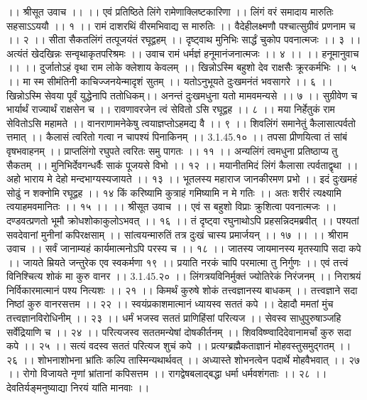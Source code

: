 ।। श्रीसूत उवाच ।। ।।
एवं प्रतिष्ठिते लिंगे रामेणाक्लिष्टकारिणा ।।
लिंगं वरं समादाय मारुतिः सहसाऽऽययौ ।। १ ।।
रामं दाशरथिं वीरमभिवाद्य स मारुतिः ।।
वैदेहीलक्ष्मणौ पश्चात्सुग्रीवं प्रणनाम च ।। २ ।।
सीता सैकतलिंगं तत्पूजयंतं रघूद्वहम् ।।
दृष्ट्वाथ मुनिभिः सार्द्धं चुकोप पवनात्मजः ।। ३ ।।
अत्यंतं खेदखिन्नः सन्वृथाकृतपरिश्रमः ।।
उवाच रामं धर्मज्ञं हनूमानंजनात्मजः ।। ४ ।।
।। हनूमानुवाच ।। ।।
दुर्जातोऽहं वृथा राम लोके क्लेशाय केवलम् ।।
खिन्नोऽस्मि बहुशो देव राक्षसैः क्रूरकर्मभिः ।। ५ ।।
मा स्म सीमंतिनी काचिज्जनयेन्मादृशं सुतम् ।।
यतोऽनुभूयते दुःखमनंतं भवसागरे ।। ६ ।।
खिन्नोऽस्मि सेवया पूर्वं युद्धेनापि ततोधिकम्।।
अनन्तं दुःखमधुना यतो मामवमन्यसे ।। ७ ।।
सुग्रीवेण च भार्यार्थं राज्यार्थं राक्षसेन च ।।
रावणावरजेन त्वं सेवितो ऽसि रघूद्वह ।। ८ ।।
मया निर्हेतुकं राम सेवितोऽसि महामते ।।
वानराणामनेकेषु त्वयाज्ञप्तोऽहमद्य वै ।। ९ ।।
शिवलिंगं समानेतुं कैलासात्पर्वतो त्तमात् ।।
कैलासं त्वरितो गत्वा न चापश्यं पिनाकिनम् ।। 3.1.45.१० ।।
तपसा प्रीणयित्वा तं सांबं वृषभवाहनम् ।।
प्राप्तलिंगो रघुपते त्वरितः समु पागतः ।। ११ ।।
अन्यलिंगं त्वमधुना प्रतिष्ठाप्य तु सैकतम् ।।
मुनिभिर्देवगन्धर्वैः साकं पूजयसे विभो ।। १२ ।।
मयानीतमिदं लिंगं कैलासा त्पर्वताद्वृथा ।।
अहो भाराय मे देहो मन्दभाग्यस्यजायते ।। १३ ।।
भूतलस्य महाराज जानकीरमण प्रभो ।।
इदं दुःखमहं सोढुं न शक्नोमि रघूद्वह ।। १४
किं करिष्यामि कुत्राहं गमिष्यामि न मे गतिः ।।
अतः शरीरं त्यक्ष्यामि त्वयाहमवमानितः ।। १५ ।।
।। श्रीसूत उवाच ।।
एवं स बहुशो विप्राः क्रुशित्वा पवनात्मजः ।।
दण्डवत्प्रणतो भूमौ क्रोधशोकाकुलोऽभवत् ।। १६ ।।
तं दृष्ट्वा रघुनाथोऽपि प्रहसन्निदमब्रवीत् ।।
पश्यतां सवदेवानां मुनीनां कपिरक्षसाम् ।।
सांत्वयन्मारुतिं तत्र दुःखं चास्य प्रमार्जयन् ।। १७ ।।
।। श्रीराम उवाच ।।
सर्वं जानाम्यहं कार्यमात्मनोऽपि परस्य च ।। १८ ।।
जातस्य जायमानस्य मृतस्यापि सदा कपे ।।
जायते म्रियते जन्तुरेक एव स्वकर्मणा १९ ।।
प्रयाति नरकं चापि परमात्मा तु निर्गुणः ।।
एवं तत्त्वं विनिश्चित्य शोकं मा कुरु वानर ।। 3.1.45.२० ।।
लिंगत्रयविनिर्मुक्तं ज्योतिरेकं निरंजनम् ।।
निराश्रयं निर्विकारमात्मानं पश्य नित्यशः ।। २१ ।।
किमर्थं कुरुषे शोकं तत्त्वज्ञानस्य बाधकम् ।।
तत्त्वज्ञाने सदा निष्ठां कुरु वानरसत्तम ।। २२ ।।
स्वयंप्रकाशमात्मानं ध्यायस्व सततं कपे ।।
देहादौ ममतां मुंच तत्त्वज्ञानविरोधिनीम् ।। २३ ।।
धर्मं भजस्व सततं प्राणिहिंसां परित्यज ।।
सेवस्व साधुपुरुषाञ्जहि सर्वेंद्रियाणि च ।। २४ ।।
परित्यजस्व सततमन्येषां दोषकीर्तनम् ।।
शिवविष्ण्वादिदेवानामर्चां कुरु सदा कपे ।। २५ ।।
सत्यं वदस्व सततं परित्यज शुचं कपे ।।
प्रत्यग्ब्रह्मैकताज्ञानं मोहवस्तुसमुद्गतम् ।। २६ ।।
शोभनाशोभना भ्रांतिः कल्पि तास्मिन्यथार्थवत् ।।
अध्यास्ते शोभनत्वेन पदार्थे मोहवैभवात् ।। २७ ।।
रोगो विजायते नृणां भ्रांतानां कपिसत्तम ।।
रागद्वेषबलाद्बद्धा धर्मा धर्मवशंगताः ।। २८ ।।
देवतिर्यङ्मनुष्याद्या निरयं यांति मानवाः ।।
